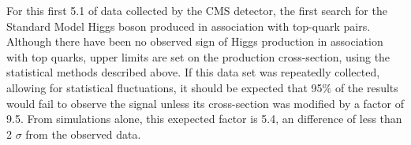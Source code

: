 \par  For this first 5.1 \fbinv of data collected by the CMS detector,
the first search for the Standard Model Higgs boson produced in
association with top-quark pairs.  Although there have been no
observed sign of Higgs production in association with top quarks,
upper limits are set on the production cross-section,  using the
statistical methods  described above.  If this data set was repeatedly
collected, allowing for statistical fluctuations, it should be
expected that 95$\%$ of the results would fail to observe the signal
unless its cross-section was modified by a factor of 9.5.  From
simulations alone, this exepected factor is 5.4, an difference of less
than 2 $\sigma$ from the observed data.   